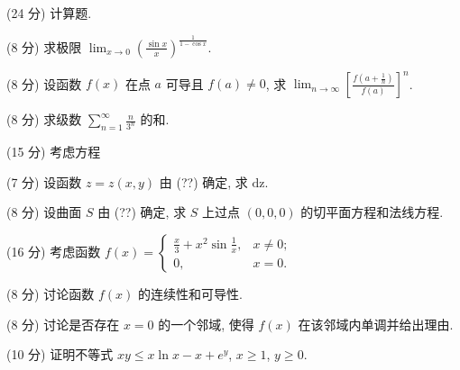 \par{}
(24 分) 计算题.\par
(8 分) 求极限 $\lim_{x \to 0} \left( \frac{\sin x}{x} \right)^{\frac{1}{1 - \cos x}}$.\par
(8 分) 设函数 $f(x)$ 在点 $a$ 可导且 $f(a) \neq 0$, 求 $\lim_{n \to \infty} \left[ \frac{f\left(a + \frac{1}{n}\right)}{f(a)} \right]^n$.\par
(8 分) 求级数 $\sum_{n=1}^{\infty} \frac{n}{3^n}$ 的和.\par
\par{}
\par{}
(15 分) 考虑方程\par
\nopagebreak[4]
(7 分) 设函数 $z = z(x, y)$ 由 (??) 确定, 求 $\mathrm{dz}$.\par
(8 分) 设曲面 $S$ 由 (??) 确定, 求 $S$ 上过点 $(0,0,0)$ 的切平面方程和法线方程.\par
\par{}
(16 分) 考虑函数 $f(x) = \begin{cases} \frac{x}{3} + x^2 \sin \frac{1}{x}, & x \neq 0; \\ 0, & x = 0. \end{cases}$\par
(8 分) 讨论函数 $f(x)$ 的连续性和可导性.\par
(8 分) 讨论是否存在 $x = 0$ 的一个邻域, 使得 $f(x)$ 在该邻域内单调并给出理由.\par
\par{}
(10 分) 证明不等式 $xy \leq x \ln x - x + e^y$, $x \geq 1$, $y \geq 0$.\par
